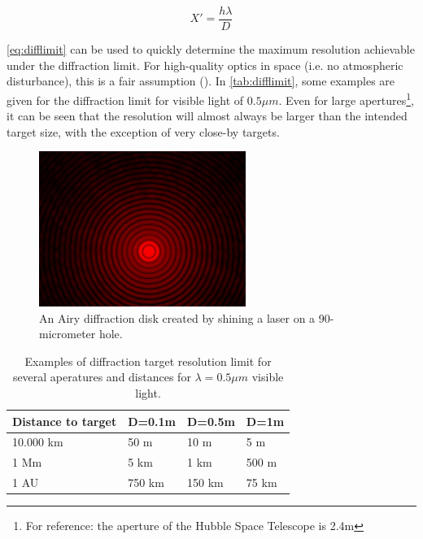 \begin{equation}
    X' = \frac{h \lambda}{D}
    \label{eq:difflimit}
\end{equation}

\autoref{eq:difflimit} can be used to quickly determine the maximum resolution achievable under the diffraction limit. For high-quality optics in space (i.e. no atmospheric disturbance), this is a fair assumption (\cite{SMAD}). In \autoref{tab:difflimit}, some examples are given for the diffraction limit for visible light of $0.5\mu m$. Even for large apertures\footnote{For reference: the aperture of the Hubble Space Telescope is 2.4m}, it can be seen that the resolution will almost always be larger than the intended target size, with the exception of very close-by targets.\\
\begin{figure}[htbp]
    \centering
    \includegraphics[width=0.6\textwidth]{images/diffraction.jpg}
    \caption{An Airy diffraction disk created by shining a laser on a 90-micrometer hole.}
    \label{fig:airydiffraction}
\end{figure}

\begin{table}[htbp]
\centering
\caption{Examples of diffraction target resolution limit for several aperatures and distances for $\lambda=0.5\mu m$ visible light.}
\label{tab:difflimit}
\begin{tabular}{l|lll}
\textbf{Distance to target} & \textbf{D=0.1m} & \textbf{D=0.5m} & \textbf{D=1m} \\ \hline
10.000 km                   & 50 m            & 10 m            & 5 m           \\
1 Mm                        & 5 km            & 1 km            & 500 m         \\
1 AU                        & 750 km          & 150 km          & 75 km        
\end{tabular}
\end{table}


